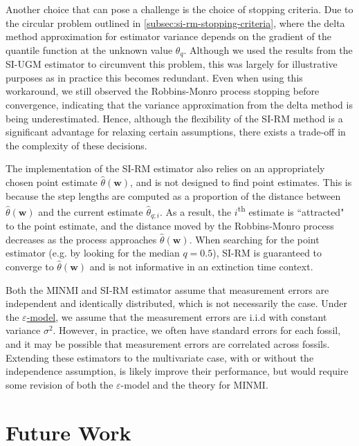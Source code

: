 Another choice that can pose a challenge is the choice of stopping criteria. Due to the circular problem outlined in \autoref{subsec:si-rm-stopping-criteria}, where the delta method approximation for estimator variance depends on the gradient of the quantile function at the unknown value $\theta_q$. Although we used the results from the SI-UGM estimator to circumvent this problem, this was largely for illustrative purposes as in practice this becomes redundant. Even when using this workaround, we still observed the Robbins-Monro process stopping before convergence, indicating that the variance approximation from the delta method is being underestimated. Hence, although the flexibility of the SI-RM method is a significant advantage for relaxing certain assumptions, there exists a trade-off in the complexity of these decisions.

The implementation of the SI-RM estimator also relies on an appropriately chosen point estimate $\hat\theta(\bm{w})$, and is not designed to find point estimates. This is because the step lengths are computed as a proportion of the distance between $\hat\theta(\bm{w})$ and the current estimate $\hat\theta_{q; i}$. As a result, the $i$\textsuperscript{th} estimate is ``attracted" to the point estimate, and the distance moved by the Robbins-Monro process decreases as the process approaches $\hat\theta(\bm{w})$. When searching for the point estimator (e.g. by looking for the median $q=0.5$), SI-RM is guaranteed to converge to $\hat\theta(\bm{w})$ and is not informative in an extinction time context.

Both the MINMI and SI-RM estimator assume that measurement errors are independent and identically distributed, which is not necessarily the case. Under the \hyperref[model: measurement-error]{$\varepsilon$-model}, we assume that the measurement errors are i.i.d with constant variance $\sigma^2$. However, in practice, we often have standard errors for each fossil, and it may be possible that measurement errors are correlated across fossils. Extending these estimators to the multivariate case, with or without the independence assumption, is likely improve their performance, but would require some revision of both the $\varepsilon$-model and the theory for MINMI.

\section{Future Work}

